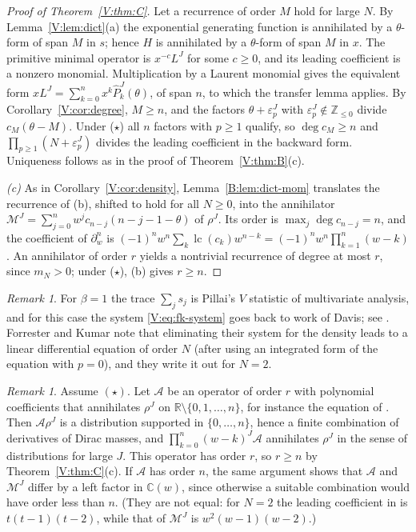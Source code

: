 \documentclass[11pt,a4paper]{article}
\theoremstyle{definition}
\theoremstyle{remark}
\newtheorem{remark}[theorem]{Remark}
\newcommand{\C}{\mathbb C}
\newcommand{\Z}{\mathbb Z}
\newcommand{\R}{\mathbb R}
\DeclareMathOperator{\lc}{lc}
\numberwithin{equation}{section}
\begin{document}
\begin{proof}[Proof of Theorem~\ref{V:thm:C}]
Let a recurrence of order $M$ hold for large $N$. By Lemma~\ref{V:lem:dict}(a) the exponential generating function is annihilated by a $\theta$-form of span $M$ in $s$; hence $H$ is annihilated by a $\theta$-form of span $M$ in $x$. The primitive minimal operator is $x^{-c}L^J$ for some $c\ge0$, and its leading coefficient is a nonzero monomial. Multiplication by a Laurent monomial gives the equivalent form $xL^J=\sum_{k=0}^{n}x^k\hat P^J_k(\theta)$, of span $n$, to which the transfer lemma applies. By Corollary~\ref{V:cor:degree}, $M\ge n$, and the factors $\theta+\varepsilon^J_p$ with $\varepsilon^J_p\notin\Z_{\le0}$ divide $c_M(\theta-M)$. Under \textup{($\star$)} all $n$ factors with $p\ge1$ qualify, so $\deg c_M\ge n$ and $\prod_{p\ge1}(N+\varepsilon^J_p)$ divides the leading coefficient in the backward form. Uniqueness follows as in the proof of Theorem~\ref{V:thm:B}(c).

\emph{(c)} As in Corollary~\ref{V:cor:density}, Lemma~\ref{B:lem:dict-mom} translates the recurrence of (b), shifted to hold for all $N\ge0$, into the annihilator $\mathcal M^J=\sum_{j=0}^{n}w^jc_{n-j}(n-j-1-\theta)$ of $\rho^J$. Its order is $\max_j\deg c_{n-j}=n$, and the coefficient of $\partial_w^n$ is $(-1)^nw^n\sum_k\lc(c_k)w^{n-k}=(-1)^nw^n\prod_{k=1}^n(w-k)$. An annihilator of order $r$ yields a nontrivial recurrence of degree at most $r$, since $m_N>0$; under \textup{($\star$)}, (b) gives $r\ge n$.
\end{proof}

\begin{remark}
For $\beta=1$ the trace $\sum_js_j$ is Pillai's $V$ statistic of multivariate analysis, and for this case the system \eqref{V:eq:fk-system} goes back to work of Davis; see \cite[Remark~2.6]{FK22}. Forrester and Kumar \cite[Remark~3.8]{FK22} note that eliminating their system for the density leads to a linear differential equation of order $N$ (after using an integrated form of the equation with $p=0$), and they write it out for $N=2$.
\end{remark}

\begin{remark}\label{V:rem:FK38}
Assume $(\star)$. Let $\mathcal A$ be an operator of order $r$ with polynomial coefficients that annihilates $\rho^J$ on $\R\setminus\{0,1,\dots,n\}$, for instance the equation of \cite[Remark~3.8]{FK22}. Then $\mathcal A\rho^J$ is a distribution supported in $\{0,\dots,n\}$, hence a finite combination of derivatives of Dirac masses, and $\prod_{k=0}^n(w-k)^J\mathcal A$ annihilates $\rho^J$ in the sense of distributions for large $J$. This operator has order $r$, so $r\ge n$ by Theorem~\ref{V:thm:C}(c). If $\mathcal A$ has order $n$, the same argument shows that $\mathcal A$ and $\mathcal M^J$ differ by a left factor in $\C(w)$, since otherwise a suitable combination would have order less than $n$. (They are not equal: for $N=2$ the leading coefficient in \cite[(3.35)]{FK22} is $t(t-1)(t-2)$, while that of $\mathcal M^J$ is $w^2(w-1)(w-2)$.)
\end{remark}
\end{document}
